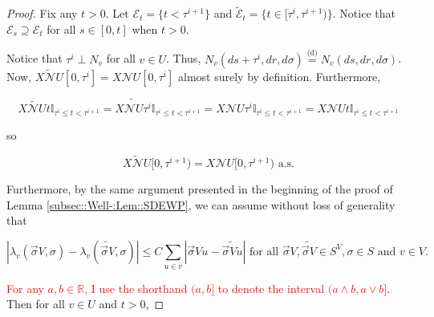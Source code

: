 \documentclass[12pt]{article}
\newcommand{\mb}{\mathbb}
\newcommand{\mc}{\mathcal}
\newcommand{\ov}{\overline}
\newcommand{\te}{\text}
\newcommand{\tr}{\textcolor{red}}
\newcommand{\ind}{\hspace{24pt}}
\newcommand{\deq}{\overset{\text{(d)}}{=}}			%
\renewcommand{\v}{v}							%
\newcommand{\vv}{u}								%
\renewcommand{\U}{U}							%
\renewcommand{\S}{S}							%
\newcommand{\s}{\sigma}							%
\newcommand{\sv}{\vec{\s}}						%
\renewcommand{\t}{t}							%
\renewcommand{\tt}{s}							%
\newcommand{\X}{X}								%
\newcommand{\neigh}{\mc{N}}						%
\newcommand{\cl}{\ov}							%
\newcommand{\const}{C}							%
\newcommand{\poiss}[1]{N_{#1}}						%
\newcommand{\rt}[1]{\tau^{#1}}						%
\newcommand{\itt}{i}								%
\newcommand{\XState}[1]{\S^{#1}}				%
\newcommand{\rate}[1]{\lambda_{#1}}					%
\newcommand{\alt}{\widetilde}						%
\newcommand{\evnt}{\mc{E}}						%
\begin{document}
\begin{proof}
\ind Fix any \(\t > 0\). Let \(\evnt_\t = \{\t < \rt{\itt+1}\}\) and \(\alt{\evnt}_\t = \{\t\in [\rt{\itt},\rt{\itt+1})\}\). Notice that \(\evnt_\tt \supseteq \evnt_\t\) for all \(\tt\in [0,\t]\) when \(\t > 0\). 

\ind Notice that \(\rt{\itt} \perp \poiss{\v}\) for all \(\v \in \U\). Thus, \(\poiss{\v}(d\tt+\rt{\itt},dr,d\s) \deq \poiss{\v}(d\tt,dr,d\s)\). Now, \(\alt{\X{\neigh{\U}}{}}[0,\rt{\itt}] = \X{\neigh{\U}}{[0,\rt{\itt}]}\) almost surely by definition. Furthermore,

\[\alt{\X{\neigh{\U}}{\t}}\mb{I}_{\rt{\itt}\leq \t < \rt{\itt+1}} = \alt{\X{\neigh{\U}}{\rt{\itt}}}\mb{I}_{\rt{\itt}\leq \t < \rt{\itt+1}} = \X{\neigh{\U}}{\rt{\itt}}\mb{I}_{\rt{\itt}\leq \t < \rt{\itt+1}} = \X{\neigh{\U}}{\t}\mb{I}_{\rt{\itt}\leq \t < \rt{\itt+1}}\]

so

\[\alt{\X{\neigh{\U}}{}}[0,\rt{\itt+1}) = \X{\neigh{\U}}{[0,\rt{\itt+1})} \te{ a.s.}\]

Furthermore, by the same argument presented in the beginning of the proof of Lemma \ref{subsec::Well-:Lem::SDEWP}, we can assume without loss of generality that 

\[|\rate{\v}(\sv{ V}{},\s) - \rate{\v}(\alt{\sv{ V}{}},\s)| \leq \const{}\sum_{\vv\in \cl{\v}} |\sv{ V}{\vv} - \alt{\sv{ V}{\vv}}|\te{ for all } \sv{ V}{},\alt{\sv{ V}{}}\in \S^ V,\s \in \S \te{ and } \v \in  V.\]

\tr{For any \(a,b\in \mb{R}\), I use the shorthand \((a,b]\) to denote the interval \((a\wedge b,a\vee b]\)}. Then for all \(v\in \U\) and \(\t > 0\),


\end{proof}
\end{document}
